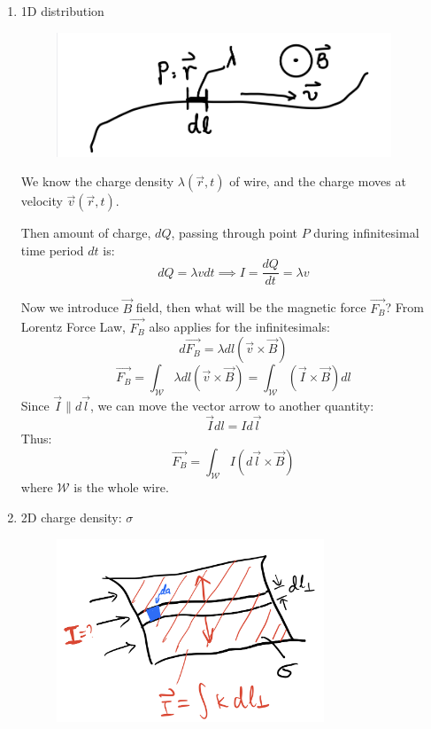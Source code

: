 \documentclass[12pt,a4paper,twoside]{article}
\numberwithin{equation}{section}
\begin{document}
    \begin{enumerate}
        \item 1D distribution
        
        \begin{figure}[t]
            \centering
            \includegraphics[width = 10cm]{250-Revision/current-1d.jpeg}
        \end{figure}
        
        We know the charge density $\lambda (\overrightarrow{r},t)$ of wire, and the charge moves at velocity $\overrightarrow{v}(\overrightarrow{r}, t)$.
        
        Then amount of charge, $dQ$, passing through point $P$ during infinitesimal time period $dt$ is:
        \[dQ=\lambda vdt\implies \boxed{I=\frac{dQ}{dt}=\lambda v}\]
        
        Now we introduce $\overrightarrow{B}$ field, then what will be the magnetic force $\overrightarrow{F_B}$? From Lorentz Force Law, $\overrightarrow{F_B}$ also applies for the infinitesimals:
        \[d\overrightarrow{F_B}=\lambda dl(\overrightarrow{v}\times \overrightarrow{B})\]
        \[\overrightarrow{F_B}=\int_{\mathcal{W}}\lambda dl(\overrightarrow{v}\times \overrightarrow{B})=\int_{\mathcal{W}}(\overrightarrow{I}\times \overrightarrow{B})dl\]
        Since $\overrightarrow{I}\parallel d\overrightarrow{l}$, we can move the vector arrow to another quantity:
        \[\overrightarrow{I}dl=Id\overrightarrow{l}\]
        Thus:
        \begin{equation}
            \boxed{\overrightarrow{F_B}=\int_{\mathcal{W}}I(d\overrightarrow{l}\times \overrightarrow{B})}
        \end{equation}
        where $\mathcal{W}$ is the whole wire.
        
        \item 2D charge density: \(\sigma\)
        \begin{figure}[ht]
            \centering
            \includegraphics[width=8cm]{250-Revision/current-2d.jpeg}
        \end{figure}
        

\end{enumerate}
\end{document}
